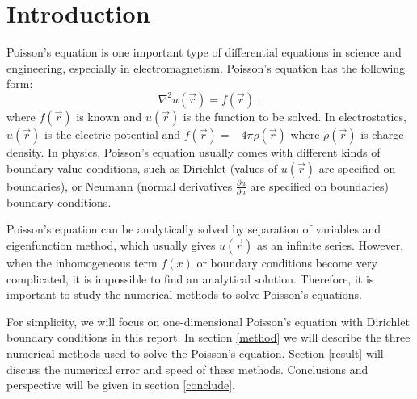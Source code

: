 \documentclass{article}
\begin{document}
	\section{Introduction}
	Poisson's equation is one important type of differential equations in science and engineering, 
	especially in electromagnetism. 
	Poisson's equation has the following form: 
	\begin{equation}
	\nabla^{2} u\left( \vec{r}\right)  = f\left( \vec{r} \right) \ ,
	\end{equation}
	where $f\left( \vec{r}\right)$ is known and 
	$u\left( \vec{r}\right)$ is the function to be solved. 
	In electrostatics, $u\left( \vec{r}\right)$ is the electric potential and 
	$f\left( \vec{r}\right)=-4\pi \rho\left( \vec{r} \right)$ 
	where $\rho\left( \vec{r} \right) $ is charge density. 
	In physics, Poisson's equation usually comes with different kinds of boundary value conditions, 
	such as Dirichlet (values of $u\left( \vec{r}\right)$ are specified on boundaries), 
	or Neumann (normal derivatives $\frac{\partial u}{\partial n}$ are specified on boundaries) 
	boundary conditions. 
	\par
	Poisson's equation can be analytically solved by separation of variables and eigenfunction method, 
	which usually gives $u\left( \vec{r}\right)$ as an infinite series. 
	However, when the inhomogeneous term $f(x)$ or boundary conditions become very complicated, 
	it is impossible to find an analytical solution. 
	Therefore, it is important to study the numerical methods to solve Poisson's equations. 
	\par
	For simplicity, we will focus on one-dimensional Poisson's equation 
	with Dirichlet boundary conditions in this report. 
    In section \ref{method} we will describe the three numerical methods 
    used to solve the Poisson's equation. 
    Section \ref{result} will discuss the numerical error and speed of these methods. 
    Conclusions and perspective will be given in section \ref{conclude}. 
	
\end{document}
